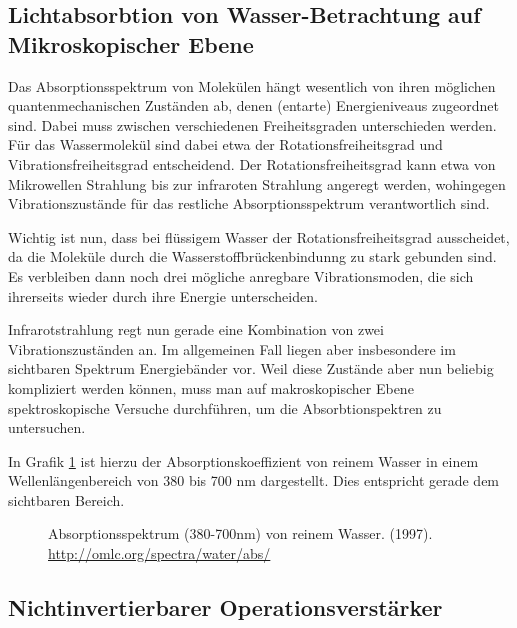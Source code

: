 \documentclass[12pt,a4paper,titlepage,headinclude,bibtotoc]{scrartcl}
\begin{document}
\subsection{Lichtabsorbtion von Wasser-Betrachtung auf Mikroskopischer Ebene}
Das Absorptionsspektrum von Molekülen hängt wesentlich von ihren möglichen 
quantenmechanischen Zuständen ab, denen (entarte) Energieniveaus zugeordnet sind. Dabei muss zwischen verschiedenen Freiheitsgraden
unterschieden werden. Für das Wassermolekül sind dabei etwa der Rotationsfreiheitsgrad und Vibrationsfreiheitsgrad entscheidend.
Der Rotationsfreiheitsgrad kann etwa von Mikrowellen Strahlung bis zur infraroten Strahlung angeregt werden, wohingegen Vibrationszustände für das restliche Absorptionsspektrum verantwortlich sind.


Wichtig ist nun, dass bei flüssigem Wasser der Rotationsfreiheitsgrad ausscheidet, da die Moleküle durch die Wasserstoffbrückenbindunng zu stark gebunden sind.
Es verbleiben dann noch drei mögliche anregbare Vibrationsmoden, die sich ihrerseits wieder durch ihre Energie unterscheiden.

Infrarotstrahlung regt nun gerade eine Kombination von zwei Vibrationszuständen an.
Im allgemeinen Fall liegen aber insbesondere im sichtbaren Spektrum Energiebänder vor.
Weil diese Zustände aber nun beliebig kompliziert werden können, muss man auf makroskopischer Ebene spektroskopische Versuche durchführen, um die Absorbtionspektren zu untersuchen.

In Grafik \ref{fig:abs} ist hierzu der Absorptionskoeffizient von reinem Wasser in einem Wellenlängenbereich von 380 bis 700 nm dargestellt.
Dies entspricht gerade dem sichtbaren Bereich.

\cite{abs}





\begin{figure}[h]
	\centering
	
	\caption{Absorptionsspektrum (380-700nm) von reinem Wasser. (1997). \url{http://omlc.org/spectra/water/abs/}}
	\label{fig:abs}
\end{figure}




\subsection{Nichtinvertierbarer Operationsverstärker}
\end{document}
